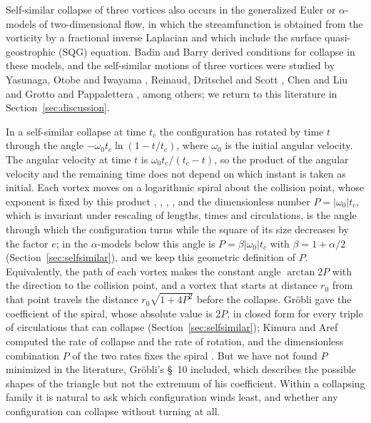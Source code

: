\documentclass[11pt]{article}
\theoremstyle{definition}
\begin{document}
Self-similar collapse of three vortices also occurs in the generalized Euler or $\alpha$-models of two-dimensional flow, in which the streamfunction is obtained from the vorticity by a fractional inverse Laplacian and which include the surface quasi-geostrophic (SQG) equation. Badin and Barry \cite{bb2018} derived conditions for collapse in these models, and the self-similar motions of three vortices were studied by Yasunaga, Otobe and Iwayama \cite{yoi2021}, Reinaud, Dritschel and Scott \cite{rds2022}, Chen and Liu \cite{cl2024} and Grotto and Pappalettera \cite{gp2025}, among others; we return to this literature in Section~\ref{sec:discussion}.

In a self-similar collapse at time $t_c$ the configuration has rotated by time $t$ through the angle $-\omega_0 t_c \ln(1 - t/t_c)$, where $\omega_0$ is the initial angular velocity. The angular velocity at time $t$ is $\omega_0 t_c/(t_c - t)$, so the product of the angular velocity and the remaining time does not depend on which instant is taken as initial. Each vortex moves on a logarithmic spiral about the collision point, whose exponent is fixed by this product \cite[p.~298]{ns1979}, \cite[Sect.~4]{cds1980}, \cite[Eq.~(29c)]{aref2010}, \cite[App.~A, Eq.~(A.19)]{dgc2023}, and the dimensionless number $P = |\omega_0| t_c$, which is invariant under rescaling of lengths, times and circulations, is the angle through which the configuration turns while the square of its size decreases by the factor $e$; in the $\alpha$-models below this angle is $P = \beta|\omega_0| t_c$ with $\beta = 1 + \alpha/2$ (Section~\ref{sec:selfsimilar}), and we keep this geometric definition of $P$. Equivalently, the path of each vortex makes the constant angle $\arctan 2P$ with the direction to the collision point, and a vortex that starts at distance $r_0$ from that point travels the distance $r_0 \sqrt{1 + 4P^2}$ before the collapse. Gr\"obli gave the coefficient of the spiral, whose absolute value is $2P$, in closed form for every triple of circulations that can collapse \cite[\S~10]{grobli1877} (Section~\ref{sec:selfsimilar}); Kimura \cite{kimura1987} and Aref \cite{aref2010} computed the rate of collapse and the rate of rotation, and the dimensionless combination $P$ of the two rates fixes the spiral \cite[Eq.~(29c)]{aref2010}. But we have not found $P$ minimized in the literature, Gr\"obli's \S~10 included, which describes the possible shapes of the triangle but not the extremum of his coefficient. Within a collapsing family it is natural to ask which configuration winds least, and whether any configuration can collapse without turning at all.
\end{document}
